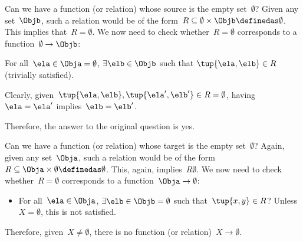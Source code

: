 \begin{example}
  Can we have a function (or relation) whose source is the empty set~$\emptyset$? Given any set~$\Objb$, such a relation would be of the form~$R\subseteq \emptyset \times \Objb \definedas \emptyset$. This implies that~$R=\emptyset$. We now need to check whether~$R=\emptyset$ corresponds to a function~$\emptyset\to \Objb$:
  \begin{compactitem}
    \item For all~$\ela\in \Obja=\emptyset$, $\exists \elb \in \Objb$ such that $\tup{\ela,\elb}\in R$ (trivially satisfied).
    \item Clearly, given~$\tup{\ela,\elb}, \tup{\ela',\elb'}\in R=\emptyset$, having~$\ela=\ela'$ implies~$\elb=\elb'$.
  \end{compactitem}
  Therefore, the answer to the original question is yes.
\end{example}

\begin{example}
  Can we have a function (or relation) whose target is the empty set~$\emptyset$? Again, given any set~$\Obja$, such a relation would be of the form~$R\subseteq \Obja\times \emptyset\definedas \emptyset$. This, again, implies~$R\emptyset$. We now need to check whether~$R=\emptyset$ corresponds to a function~$\Obja \to \emptyset$:
  \begin{itemize}
    \item For all~$\ela\in \Obja$, $\exists \elb\in \Objb=\emptyset$ such that~$\tup{x,y}\in R$? Unless~$X=\emptyset$, this is not satisfied.
  \end{itemize}
  Therefore, given~$X\neq \emptyset$, there is no function (or relation)~$X\to \emptyset$.
\end{example}

